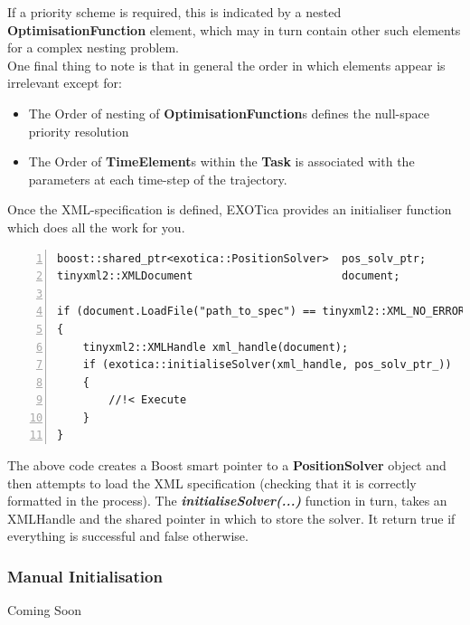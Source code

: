 \documentclass[12pt,a4paper,onecolumn]{article}
\begin{document}
\newline
\noindent If a priority scheme is required, this is indicated by a nested \textbf{OptimisationFunction} element, which may in turn contain other such elements for a complex nesting problem.\\
\newline
\noindent One final thing to note is that in general the order in which elements appear is irrelevant except for:
\begin{itemize}
\item The Order of nesting of \textbf{OptimisationFunction}s defines the null-space priority resolution
\item The Order of \textbf{TimeElement}s within the \textbf{Task} is associated with the parameters at each time-step of the trajectory.
\end{itemize}
\noindent Once the XML-specification is defined, EXOTica provides an initialiser function which does all the work for you.
\begin{lstlisting}[belowskip=-1.5 \baselineskip, numbers=left]
boost::shared_ptr<exotica::PositionSolver>  pos_solv_ptr;
tinyxml2::XMLDocument                       document;

if (document.LoadFile("path_to_spec") == tinyxml2::XML_NO_ERROR)
{
	tinyxml2::XMLHandle xml_handle(document);
	if (exotica::initialiseSolver(xml_handle, pos_solv_ptr_))
	{
		//!< Execute
	}
}
\end{lstlisting}
The above code creates a Boost smart pointer to a \textbf{PositionSolver} object and then attempts to load the XML specification (checking that it is correctly formatted in the process). The \textit{\textbf{initialiseSolver(...)}} function in turn, takes an XMLHandle and the shared pointer in which to store the solver. It return true if everything is successful and false otherwise.

\subsubsection*{Manual Initialisation}

Coming Soon
\end{document}
